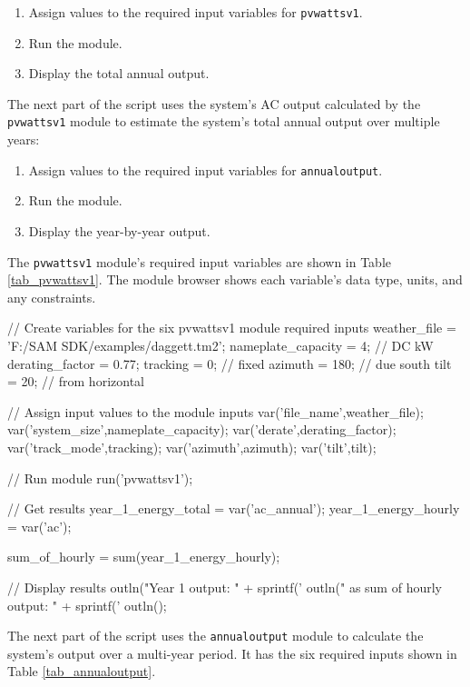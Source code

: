 \documentclass{article}
\begin{document}
\begin{enumerate}
\item Assign values to the required input variables for \texttt{pvwattsv1}.
\item Run the module.
\item Display the total annual output.
\end{enumerate}

The next part of the script uses the system's AC output calculated by the \texttt{pvwattsv1} module to estimate the system's total annual output over multiple years:

\begin{enumerate}
\item Assign values to the required input variables for \texttt{annualoutput}.
\item Run the module.
\item Display the year-by-year output.
\end{enumerate}

The \texttt{pvwattsv1} module's required input variables are shown in Table \ref{tab_pvwattsv1}. The module browser shows each variable's data type, units, and any constraints.

\begin{verbatimtab}

// Create variables for the six pvwattsv1 module required inputs
weather_file = 'F:/SAM SDK/examples/daggett.tm2';
nameplate_capacity = 4; // DC kW
derating_factor = 0.77;
tracking = 0; // fixed
azimuth = 180; // due south
tilt = 20; // from horizontal

// Assign input values to the module inputs
var('file_name',weather_file);
var('system_size',nameplate_capacity);
var('derate',derating_factor);
var('track_mode',tracking);
var('azimuth',azimuth);
var('tilt',tilt);

// Run module
run('pvwattsv1');

// Get results
year_1_energy_total = var('ac_annual');
year_1_energy_hourly = var('ac');

sum_of_hourly = sum(year_1_energy_hourly);

// Display results
outln("Year 1 output: " + sprintf('%
outln("  as sum of hourly output: " + sprintf('%
outln();

\end{verbatimtab}

The next part of the script uses the \texttt{annualoutput} module to calculate the system's output over a multi-year period. It has the six required inputs shown in Table \ref{tab_annualoutput}.
\end{document}
